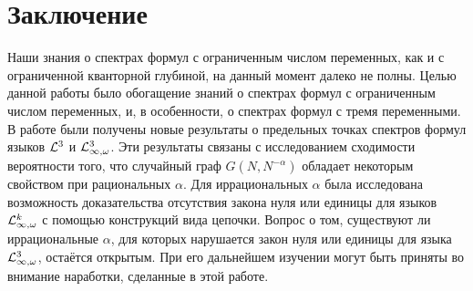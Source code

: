 \documentclass{mipt-thesis-bs}
\begin{document}
\chapter{Заключение}
Наши знания о спектрах формул с ограниченным числом переменных, как и с ограниченной кванторной глубиной, на данный момент далеко не полны.
Целью данной работы было обогащение знаний о спектрах формул с ограниченным числом переменных, и, в особенности, о спектрах формул с тремя переменными.
В работе были получены новые результаты о предельных точках спектров формул языков $\mathcal{L}^3$ и $\mathcal{L}^3_{\infty, \omega}$.
Эти результаты связаны с исследованием сходимости вероятности того, что случайный граф $G(N, N^{-\alpha})$ обладает некоторым свойством при рациональных $\alpha$.
Для иррациональных $\alpha$ была исследована возможность доказательства отсутствия закона нуля или единицы для языков $\mathcal{L}^k_{\infty, \omega}$ с помощью конструкций вида цепочки.
Вопрос о том, существуют ли иррациональные $\alpha$, для которых нарушается закон нуля или единицы для языка $\mathcal{L}^3_{\infty, \omega}$, остаётся открытым.
При его дальнейшем изучении могут быть приняты во внимание наработки, сделанные в этой работе.


\backmatter


\end{document}
